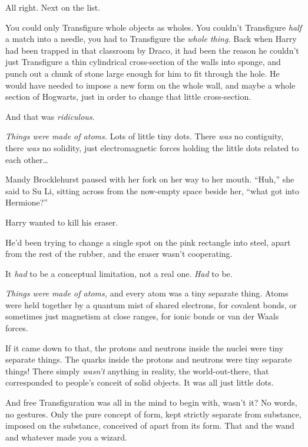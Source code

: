 All right. Next on the list.

You could only Transfigure whole objects as wholes. You couldn’t Transfigure \emph{half} a match into a needle, you had to Transfigure the \emph{whole thing.} Back when Harry had been trapped in that classroom by Draco, it had been the reason he couldn’t just Transfigure a thin cylindrical cross-section of the walls into sponge, and punch out a chunk of stone large enough for him to fit through the hole. He would have needed to impose a new form on the whole wall, and maybe a whole section of Hogwarts, just in order to change that little cross-section.

And that was \emph{ridiculous}.

\emph{Things were made of atoms.} Lots of little tiny dots. There \emph{was} no contiguity, there \emph{was} no solidity, just electromagnetic forces holding the little dots related to each other…

\later

Mandy Brocklehurst paused with her fork on her way to her mouth. “Huh,” she said to Su Li, sitting across from the now-empty space beside her, “what got into Hermione?”

\later

Harry wanted to kill his eraser.

He’d been trying to change a single spot on the pink rectangle into steel, apart from the rest of the rubber, and the eraser wasn’t cooperating.

It \emph{had} to be a conceptual limitation, not a real one. \emph{Had} to be.

\emph{Things were made of atoms,} and every atom was a tiny separate thing. Atoms were held together by a quantum mist of shared electrons, for covalent bonds, or sometimes just magnetism at close ranges, for ionic bonds or van der Waals forces.

If it came down to that, the protons and neutrons inside the nuclei were tiny separate things. The quarks inside the protons and neutrons were tiny separate things! There simply \emph{wasn’t} anything in reality, the world-out-there, that corresponded to people’s conceit of solid objects. It was all just little dots.

And free Transfiguration was all in the mind to begin with, wasn’t it? No words, no gestures. Only the pure concept of form, kept strictly separate from substance, imposed on the substance, conceived of apart from its form. That and the wand and whatever made you a wizard.

